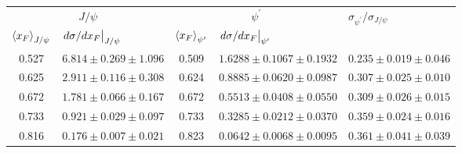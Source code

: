 \begin{tabular}{cc|cc|c}
\hline
\multicolumn{2}{c|}{$J/\psi$} &
  \multicolumn{2}{c|}{$\psi^{\prime}$} &
  \multicolumn{1}{l}{\multirow{2}{*}{$\sigma_{\psi^\prime}/\sigma_{J/\psi}$}} \\ \cline{1-4}
\multicolumn{1}{l}{$\expval{x_F}_{J/\psi}$} &
  \multicolumn{1}{l|}{$\eval{d\sigma/dx_F}_{J/\psi}$} &
  \multicolumn{1}{l}{$\expval{x_F}_{\psi^\prime}$} &
  \multicolumn{1}{l|}{$\eval{d\sigma/dx_F}_{\psi^\prime}$} &
  \multicolumn{1}{l}{} \\ \hline
\multicolumn{1}{c|}{0.527} &
  $6.814\pm0.269\pm1.096$ &
  \multicolumn{1}{c|}{0.509} &
  $1.6288\pm0.1067\pm0.1932$ &
  $0.235\pm0.019\pm0.046$ \\
\multicolumn{1}{c|}{0.625} &
  $2.911\pm0.116\pm0.308$ &
  \multicolumn{1}{c|}{0.624} &
  $0.8885\pm0.0620\pm0.0987$ &
  $0.307\pm0.025\pm0.010$ \\
\multicolumn{1}{c|}{0.672} &
  $1.781\pm0.066\pm0.167$ &
  \multicolumn{1}{c|}{0.672} &
  $0.5513\pm0.0408\pm0.0550$ &
  $0.309\pm0.026\pm0.015$ \\
\multicolumn{1}{c|}{0.733} &
  $0.921\pm0.029\pm0.097$ &
  \multicolumn{1}{c|}{0.733} &
  $0.3285\pm0.0212\pm0.0370$ &
  $0.359\pm0.024\pm0.016$ \\
\multicolumn{1}{c|}{0.816} &
  $0.176\pm0.007\pm0.021$ &
  \multicolumn{1}{c|}{0.823} &
  $0.0642\pm0.0068\pm0.0095$ &
  $0.361\pm0.041\pm0.039$ \\ \hline
\end{tabular}
